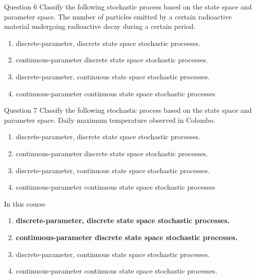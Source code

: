 \documentclass[12pt,ignorenonframetext,]{beamer}
\begin{document}
\begin{frame}{Question 6}
\protect\hypertarget{question-6}{}
Classify the following stochastic process based on the state space and
parameter space. The number of particles emitted by a certain
radioactive material undergoing radioactive decay during a certain
period.

\begin{enumerate}
\item
  discrete-parameter, discrete state space stochastic processes.
\item
  continuous-parameter discrete state space stochastic processes.
\item
  discrete-parameter, continuous state space stochastic processes.
\item
  continuous-parameter continuous state space stochastic processes
\end{enumerate}
\end{frame}

\begin{frame}{Question 7}
\protect\hypertarget{question-7}{}
Classify the following stochastic process based on the state space and
parameter space. Daily maximum temperature observed in Colombo.

\begin{enumerate}
\item
  discrete-parameter, discrete state space stochastic processes.
\item
  continuous-parameter discrete state space stochastic processes.
\item
  discrete-parameter, continuous state space stochastic processes.
\item
  continuous-parameter continuous state space stochastic processes
\end{enumerate}
\end{frame}

\begin{frame}{In this course}
\protect\hypertarget{in-this-course}{}
\begin{enumerate}
\item
  \textbf{discrete-parameter, discrete state space stochastic
  processes.}
\item
  \textbf{continuous-parameter discrete state space stochastic
  processes.}
\item
  discrete-parameter, continuous state space stochastic processes.
\item
  continuous-parameter continuous state space stochastic processes.
\end{enumerate}
\end{frame}
\end{document}
